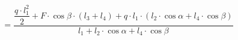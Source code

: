 \documentclass[preview]{standalone}
\begin{document}
\begin{align*}
= \dfrac{\dfrac{q\cdot l_1^2}{2} + F\cdot \cos{\beta} \cdot (l_3 + l_4) + q\cdot l_1\cdot (l_2\cdot \cos{\alpha} + l_4\cdot\cos{\beta})}{l_1 + l_2\cdot \cos{\alpha} + l_4\cdot \cos{\beta}}
\end{align*}
\end{document}
